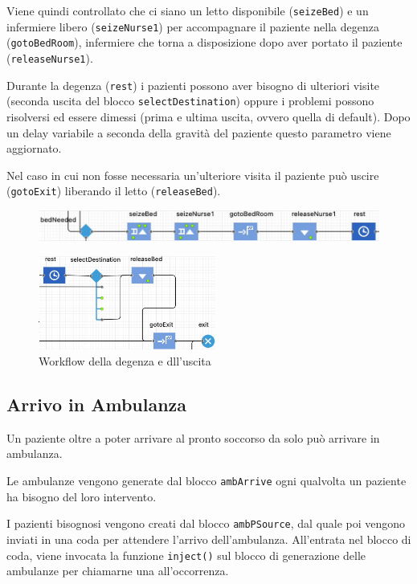 Viene quindi controllato che ci siano un letto disponibile (\texttt{seizeBed}) e un infermiere libero (\texttt{seizeNurse1}) per accompagnare il paziente nella degenza (\texttt{gotoBedRoom}), infermiere che torna a disposizione dopo aver portato il paziente (\texttt{releaseNurse1}).

Durante la degenza (\texttt{rest}) i pazienti possono aver bisogno di ulteriori visite (seconda uscita del blocco \texttt{selectDestination}) oppure i problemi possono risolversi ed essere dimessi (prima e ultima uscita, ovvero quella di default). Dopo un delay variabile a seconda della gravità del paziente questo parametro viene aggiornato.

Nel caso in cui non fosse necessaria un’ulteriore visita il paziente può uscire (\texttt{gotoExit}) liberando il letto (\texttt{releaseBed}).


\begin{figure}[!htb]
    \centering
    \includegraphics[width=1\textwidth]{Immagini/workflow/bed1.png}
\end{figure}
\begin{figure}[!htb]
    \centering
    \includegraphics[width=220px]{Immagini/workflow/bed2.png} 
    \caption{Workflow della degenza e dll'uscita}
\end{figure}

\subsection{Arrivo in Ambulanza} \label{chap:ambulance}

Un paziente oltre a poter arrivare al pronto soccorso da solo può arrivare in ambulanza.

Le ambulanze vengono generate dal blocco \texttt{ambArrive} ogni qualvolta un paziente ha bisogno del loro intervento.

I pazienti bisognosi vengono creati dal blocco \texttt{ambPSource}, dal quale poi vengono inviati in una coda per attendere l’arrivo dell’ambulanza. All’entrata nel blocco di coda, viene invocata la funzione \texttt{inject()} sul blocco di generazione delle ambulanze per chiamarne una all’occorrenza. 

